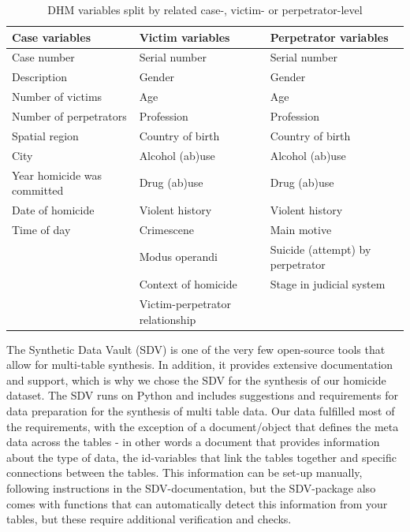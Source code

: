 \vspace{10pt}
\begin{table}[h!]
\small
\centering
\begin{tabular}{@{}lll@{}}
\toprule
Case variables              & Victim variables                & Perpetrator variables            \\ \midrule
Case number                 & Serial number                   & Serial number                    \\
Description                 & Gender                          & Gender                           \\
Number of victims           & Age                             & Age                              \\
Number of perpetrators      & Profession                      & Profession                       \\
Spatial region              & Country of birth                & Country of birth                 \\
City                        & Alcohol (ab)use                 & Alcohol (ab)use                  \\
Year homicide was committed & Drug (ab)use                    & Drug (ab)use                     \\
Date of homicide            & Violent history                 & Violent history                  \\
Time of day                 & Crimescene                      & Main motive                      \\
                            & Modus operandi                  & Suicide (attempt) by perpetrator \\
                            & Context of homicide             & Stage in judicial system         \\
                            & Victim-perpetrator relationship &                                   \\ \bottomrule       
\end{tabular}
\caption{DHM variables split by related case-, victim- or perpetrator-level}
\label{tab:my-table}
\end{table}
\vspace{10pt}

The Synthetic Data Vault (SDV) is one of the very few open-source tools that allow for multi-table synthesis. In addition, it provides extensive documentation and support, which is why we chose the SDV for the synthesis of our homicide dataset. The SDV runs on Python and includes suggestions and requirements for data preparation for the synthesis of multi table data. Our data fulfilled most of the requirements, with the exception of a document/object that defines the meta data across the tables - in other words a document that provides information about the type of data, the id-variables that link the tables together and specific connections between the tables. This information can be set-up manually, following instructions in the SDV-documentation, but the SDV-package also comes with functions that can automatically detect this information from your tables, but these require additional verification and checks.

